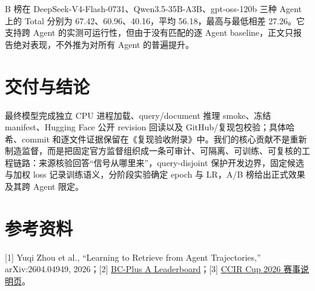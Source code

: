 \documentclass[UTF8,a4paper,10pt]{ctexart}
\begin{document}
B 榜在 DeepSeek-V4-Flash-0731、Qwen3.5-35B-A3B、gpt-oss-120b 三种 Agent 上的 Total 分别为 67.42、60.96、40.16，平均 56.18，最高与最低相差 27.26。它支持跨 Agent 的实测可运行性，但由于没有匹配的逐 Agent baseline，正文只报告绝对表现，不外推为对所有 Agent 的普遍提升。

\section{交付与结论}
最终模型完成独立 CPU 进程加载、query/document 推理 smoke、冻结 manifest、Hugging Face 公开 revision 回读以及 GitHub/复现包校验；具体哈希、commit 和逐文件证据保留在《复现验收附录》中。我们的核心贡献不是重新制造监督，而是把固定官方监督组织成一条可审计、可隔离、可训练、可复核的工程链路：来源核验回答“信号从哪里来”，query-disjoint 保护开发边界，固定候选与加权 loss 记录训练语义，分阶段实验确定 epoch 与 LR，A/B 榜给出正式效果及其跨 Agent 限定。

\begin{center}
\end{center}

\section*{参考资料}
\small
[1] Yuqi Zhou et al., ``Learning to Retrieve from Agent Trajectories,'' arXiv:2604.04949, 2026；[2] \href{https://huggingface.co/spaces/Yuqi-Zhou/BC-Plus-Leaderboard}{BC-Plus A Leaderboard}；[3] \href{https://www.xir.cn/competition/1170}{CCIR Cup 2026 赛事说明页}。
\end{document}
